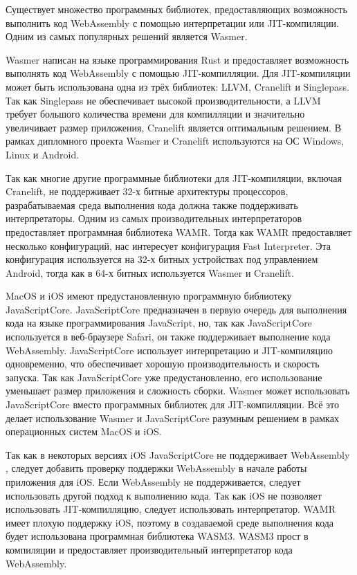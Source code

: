 Существует множество программных библиотек, предоставляющих возможность выполнить код WebAssembly с помощью интерпретации или JIT-компиляции.
Одним из самых популярных решений является Wasmer.

Wasmer написан на языке программирования Rust и предоставляет возможность выполнять код WebAssembly с помощью JIT-компилляции.
Для JIT-компиляции может быть использована одна из трёх библиотек: LLVM, Cranelift и Singlepass.
Так как Singlepass не обеспечивает высокой производительности, а LLVM требует большого количества времени для компилляции \cite{WasmerRuntimes} и значительно увеличивает размер приложения, Cranelift является оптимальным решением.
В рамках дипломного проекта Wasmer и Cranelift используются на ОС Windows, Linux и Android.

Так как многие другие программные библиотеки для JIT-компиляции, включая Cranelift, не поддерживает 32-х битные архитектуры процессоров, разрабатываемая среда выполнения кода должна также поддерживать интерпретаторы.
Одним из самых производительных интерпретаторов предоставляет программная библиотека WAMR.
Тогда как WAMR предоставляет несколько конфигураций, нас интересует конфигурация Fast Interpreter.
Эта конфигурация используется на 32-х битных устройствах под управлением Android, тогда как в 64-х битных используется Wasmer и Cranelift.

MacOS и iOS имеют предустановленную программную библиотеку JavaScriptCore.
JavaScriptCore предназначен в первую очередь для выполнения кода на языке программирования JavaScript, но, так как JavaScriptCore используется в веб-браузере Safari, он также поддерживает выполнение кода WebAssembly.
JavaScriptCore использует интерпретацию и JIT-компиляцию одновременно, что обеспечивает хорошую производительность и скорость запуска.
Так как JavaScriptCore уже предустановленно, его использование уменьшает размер приложения и сложность сборки.
Wasmer может использовать JavaScriptCore вместо программных библиотек для JIT-компилляции.
Всё это делает использование Wasmer и JavaScriptCore разумным решением в рамках операционных систем MacOS и iOS.

Так как в некоторых версиях iOS JavaScriptCore не поддерживает WebAssembly \cite{JSCNoWasm}, следует добавить проверку поддержки WebAssembly в начале работы приложения для iOS.
Если WebAssembly не поддерживается, следует использовать другой подход к выполнению кода.
Так как iOS не позволяет использовать JIT-компилляцию, следует использовать интерпретатор.
WAMR имеет плохую поддержку iOS, поэтому в создаваемой среде выполнения кода будет использована программная библиотека WASM3.
WASM3 прост в компиляции и предоставляет производительный интерпретатор кода WebAssembly.
